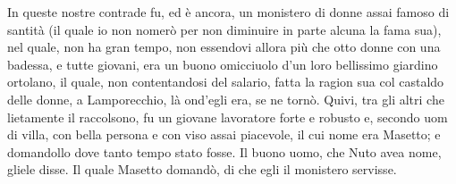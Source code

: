 \documentclass[a4paper,11pt]{book}
\begin{document}
\beginnumbering
\pstart
In queste nostre contrade fu, ed è ancora, un \gls{monistero} di donne assai famoso di santità 
(il quale io non nomerò per non diminuire in parte alcuna la fama sua), nel quale, non ha gran 
tempo, non essendovi allora più che otto donne con una badessa, e tutte giovani, era un buono 
omicciuolo d'un loro bellissimo giardino ortolano, il quale, non contentandosi del salario, fatta la 
ragion sua col castaldo delle donne, a Lamporecchio, là ond'egli era, se ne tornò. Quivi, tra gli 
altri che lietamente il raccolsono, fu un giovane lavoratore forte e robusto e, secondo uom di villa, 
con bella persona e con viso assai piacevole, il cui nome era Masetto; e 
domandollo dove tanto tempo stato fosse. Il buono uomo, che Nuto avea nome, 
gliele disse. Il quale Masetto domandò, di che egli il monistero servisse. 
\pend
\endnumbering
\printglossaries
\end{document}
